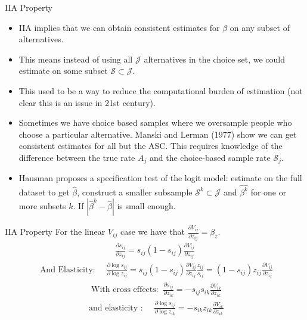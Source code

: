 \documentclass[xcolor=pdftex,dvipsnames,table,mathserif,aspectratio=169]{beamer}
\begin{document}
\begin{frame}{IIA Property}
\begin{itemize}
\item IIA implies that we can obtain consistent estimates for $\beta$ on any subset of alternatives.
\item This means instead of using all $\mathcal{J}$ alternatives in the choice set, we could estimate on some subset $\mathcal{S} \subset \mathcal{J}$.
\item This used to be a way to reduce the computational burden of estimation (not clear this is an issue in 21st century).
\item Sometimes we have \alert{choice based samples} where we oversample people who choose a particular alternative. Manski and Lerman (1977) show we can get consistent estimates for all but the ASC. This requires knowledge of the difference between the true rate $A_j$ and the choice-based sample rate $\mathcal{S}_j$.
\item Hausman proposes a specification test of the logit model: estimate on the full dataset to get $\hat{\beta}$, construct a smaller subsample $\mathcal{S}^k \subset \mathcal{J}$ and $\hat{\beta^k}$ for one or more subsets $k$. If $|\hat{\beta}^k - \hat{\beta}|$ is small enough.
\end{itemize}
\end{frame}

\begin{frame}{IIA Property}
\small
For the linear $V_{ij}$ case we have that $\frac{\partial V_{ij}}{\partial z_{ij}}=  \beta_z$.
\begin{eqnarray*}
\frac{\partial s_{ij}}{\partial z_{ij}} = s_{ij}(1- s_{ij}) \frac{\partial V_{ij}}{\partial z_{ij}}
\end{eqnarray*}
\begin{eqnarray*}
\text{ And Elasticity: }\quad  \frac{ \partial \log s_{ij}}{ \partial \log z_{ij}} = s_{ij}(1- s_{ij}) \frac{\partial V_{ij}}{\partial z_{ij}} \frac{z_{ij}}{s_{ij}} = (1- s_{ij}) z_{ij} \frac{\partial V_{ij}}{\partial z_{ij}}
\end{eqnarray*}
\begin{eqnarray*}
\text{ With cross effects: }\ \frac{\partial s_{ij}}{\partial z_{ik}} = -s_{ij} s_{ik} \frac{\partial V_{ik}}{\partial z_{ik}}
\end{eqnarray*}
\begin{eqnarray*}
\text{ and elasticity : }\quad \frac{ \partial \log s_{ij}}{ \partial \log z_{ik}} = -s_{ik} z_{ik} \frac{\partial V_{ik}}{\partial z_{ik}}
\end{eqnarray*}
\end{frame}
\end{document}
